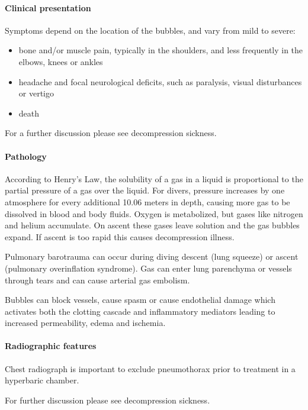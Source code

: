 \paragraph{Clinical presentation}

Symptoms depend on the location of the bubbles, and vary from mild to severe:

\begin{itemize}
	\item
	bone and/or muscle pain, typically in the shoulders, and less frequently in the elbows, knees or ankles
	\item
	headache and focal neurological deficits, such as paralysis, visual disturbances or vertigo
	\item
	death
\end{itemize}

For a further discussion please see decompression sickness.

\paragraph{Pathology}

According to Henry's Law, the solubility of a gas in a liquid is proportional to the partial pressure of a gas over the liquid. For divers, pressure increases by one atmosphere for every additional 10.06 meters in depth, causing more gas to be dissolved in blood and body fluids. Oxygen is metabolized, but gases like nitrogen and helium accumulate. On ascent these gases leave solution and the gas bubbles expand. If ascent is too rapid this causes decompression illness.

Pulmonary barotrauma can occur during diving descent (lung squeeze) or ascent (pulmonary overinflation syndrome). Gas can enter lung parenchyma or vessels through tears and can cause arterial gas embolism.

Bubbles can block vessels, cause spasm or cause endothelial damage which activates both the clotting cascade and inflammatory mediators leading to increased permeability, edema and ischemia.

\paragraph{Radiographic features}

Chest radiograph is important to exclude pneumothorax prior to treatment in a hyperbaric chamber.

For further discussion please see decompression sickness.

